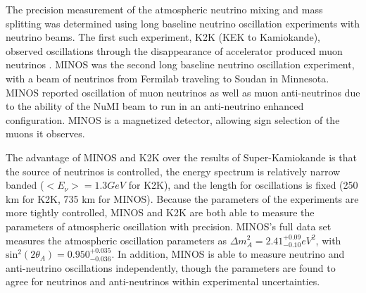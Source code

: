The precision measurement of the atmospheric neutrino mixing and mass splitting was determined using long baseline neutrino oscillation experiments with neutrino beams.  The first such experiment, K2K (KEK to Kamiokande), observed oscillations through the disappearance of accelerator produced muon neutrinos \cite{PhysRevD.74.072003}.  MINOS was the second long baseline neutrino oscillation experiment, with a beam of neutrinos from Fermilab traveling to Soudan in Minnesota.  MINOS reported oscillation \cite{PhysRevLett.106.181801} of muon neutrinos as well as muon anti-neutrinos due to the ability of the NuMI beam to run in an anti-neutrino enhanced configuration.  MINOS is a magnetized detector, allowing sign selection of the muons it observes.

The advantage of MINOS and K2K over the results of Super-Kamiokande is that the source of neutrinos is controlled, the energy spectrum is relatively narrow banded ($<E_\nu> = 1.3 GeV$ for K2K), and the length for oscillations is fixed (250 km for K2K, 735 km for MINOS).  Because the parameters of the experiments are more tightly controlled, MINOS and K2K are both able to measure the parameters of atmospheric oscillation with precision.  MINOS's full data set \cite{PhysRevD.86.052007} measures the atmospheric oscillation parameters as $\Delta m^2_A = 2.41^{+0.09}_{-0.10} eV^2$, with $\text{sin}^2(2\theta_A) = 0.950^{+0.035}_{-0.036}$.  In addition, MINOS is able to measure neutrino and anti-neutrino oscillations independently, though the parameters are found to agree for neutrinos and anti-neutrinos within experimental uncertainties.

